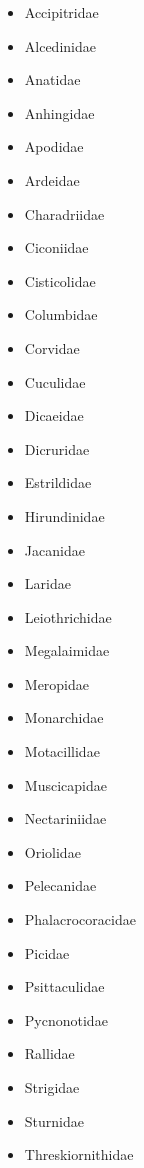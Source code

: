 \begin{itemize}%
\item%
 Accipitridae%
\item%
Alcedinidae%
\item%
Anatidae%
\item%
Anhingidae%
\item%
Apodidae%
\item%
Ardeidae%
\item%
Charadriidae%
\item%
Ciconiidae%
\item%
Cisticolidae%
\item%
Columbidae%
\item%
Corvidae%
\item%
Cuculidae%
\item%
Dicaeidae%
\item%
Dicruridae%
\item%
Estrildidae%
\item%
Hirundinidae%
\item%
Jacanidae%
\item%
Laridae%
\item%
Leiothrichidae%
\item%
Megalaimidae%
\item%
Meropidae%
\item%
Monarchidae%
\item%
Motacillidae%
\item%
Muscicapidae%
\item%
Nectariniidae%
\item%
Oriolidae%
\item%
Pelecanidae%
\item%
Phalacrocoracidae%
\item%
Picidae%
\item%
Psittaculidae%
\item%
Pycnonotidae%
\item%
Rallidae%
\item%
Strigidae%
\item%
Sturnidae%
\item%
Threskiornithidae%
\end{itemize}